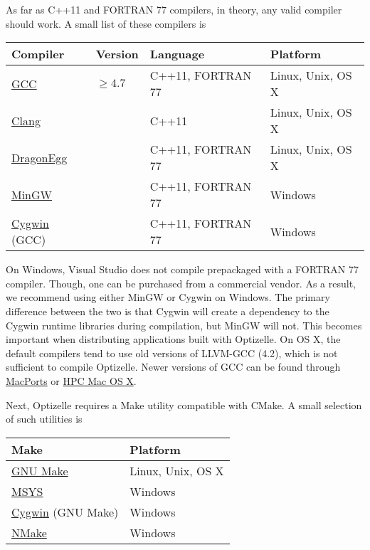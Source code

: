 \documentclass{report}
\begin{document}
        As far as C++11 and FORTRAN 77 compilers, in theory, any valid compiler should work.  A small list of these compilers is
\label{tbl:compilers}
\begin{center}\begin{tabular}{|l|l|l|l|}\hline
{\bf Compiler} & {\bf Version} & {\bf Language} & {\bf Platform}\\\hline
\href{http://gcc.gnu.org}{GCC} & $\geq 4.7$ & C++11, FORTRAN 77 & Linux, Unix, OS X \\\hline
\href{http://clang.llvm.org}{Clang} & & C++11 & Linux, Unix, OS X \\\hline
\href{http://dragonegg.llvm.org}{DragonEgg} & & C++11, FORTRAN 77 & Linux, Unix, OS X \\\hline
\href{http://www.mingw.org}{MinGW} & & C++11, FORTRAN 77 & Windows \\\hline
\href{http://www.cygwin.com}{Cygwin} (GCC) & & C++11, FORTRAN 77 & Windows \\\hline
\end{tabular}\end{center}
On Windows, Visual Studio does not compile prepackaged with a FORTRAN 77 compiler.  Though, one can be purchased from a commercial vendor.  As a result, we recommend using either MinGW or Cygwin on Windows.  The primary difference between the two is that Cygwin will create a dependency to the Cygwin runtime libraries during compilation, but MinGW will not.  This becomes important when distributing applications built with Optizelle.  On OS X, the default compilers tend to use old versions of LLVM-GCC (4.2), which is not sufficient to compile Optizelle.  Newer versions of GCC can be found through \href{https://www.macports.org}{MacPorts} or \href{http://hpc.sourceforge.net}{HPC Mac OS X}.

       Next, Optizelle requires a Make utility compatible with CMake.  A small selection of such utilities is 
\label{tbl:make}
\begin{center}\begin{tabular}{|l|l|}\hline
{\bf Make} & {\bf Platform}\\\hline
\href{https://www.gnu.org/software/make}{GNU Make} & Linux, Unix, OS X \\\hline
\href{http://www.mingw.org}{MSYS} & Windows\\\hline
\href{http://www.cygwin.com}{Cygwin} (GNU Make) & Windows \\\hline
\href{http://msdn.microsoft.com/en-us/vstudio}{NMake} & Windows \\\hline
\end{tabular}\end{center}
\end{document}
